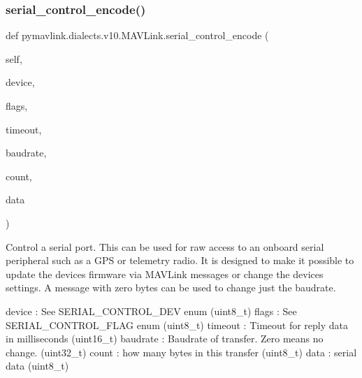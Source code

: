 \begin{DoxyVerb}
\begin{DoxyVerb}
\begin{DoxyVerb}
\begin{DoxyVerb}
\begin{DoxyVerb}
\begin{DoxyVerb}
\begin{DoxyVerb}
\begin{DoxyVerb}
\begin{DoxyVerb}
\begin{DoxyVerb}
\subsubsection{\texorpdfstring{serial\+\_\+control\+\_\+encode()}{serial\_control\_encode()}}
{\footnotesize\ttfamily def pymavlink.\+dialects.\+v10.\+M\+A\+V\+Link.\+serial\+\_\+control\+\_\+encode (\begin{DoxyParamCaption}\item[{}]{self,  }\item[{}]{device,  }\item[{}]{flags,  }\item[{}]{timeout,  }\item[{}]{baudrate,  }\item[{}]{count,  }\item[{}]{data }\end{DoxyParamCaption})}

\begin{DoxyVerb}Control a serial port. This can be used for raw access to an onboard
serial peripheral such as a GPS or telemetry radio. It
is designed to make it possible to update the devices
firmware via MAVLink messages or change the devices
settings. A message with zero bytes can be used to
change just the baudrate.

device                    : See SERIAL_CONTROL_DEV enum (uint8_t)
flags                     : See SERIAL_CONTROL_FLAG enum (uint8_t)
timeout                   : Timeout for reply data in milliseconds (uint16_t)
baudrate                  : Baudrate of transfer. Zero means no change. (uint32_t)
count                     : how many bytes in this transfer (uint8_t)
data                      : serial data (uint8_t)\end{DoxyVerb}
 \mbox{\label{classpymavlink_1_1dialects_1_1v10_1_1MAVLink_ac2ee4dfbb45624639e95a905a098066f}} 

\end{DoxyVerb}
\end{DoxyVerb}
\end{DoxyVerb}
\end{DoxyVerb}
\end{DoxyVerb}
\end{DoxyVerb}
\end{DoxyVerb}
\end{DoxyVerb}
\end{DoxyVerb}
\end{DoxyVerb}
